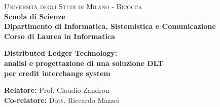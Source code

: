 \documentclass[a4paper,12pt]{report}
\begin{document}
    
    \begin{titlepage}
        
        \noindent
        \begin{minipage}[t]{0.19\textwidth}
        \end{minipage}
        \begin{minipage}[t]{0.81\textwidth}
        {
                {\textsc{Università degli Studi di Milano - Bicocca}} \\
                \textbf{Scuola di Scienze} \\
                \textbf{Dipartimento di Informatica, Sistemistica e Comunicazione} \\
                \textbf{Corso di Laurea in Informatica} \\
                \par
        }
        \end{minipage}
        
	\vspace{40mm}
        
	\begin{center}
            {\LARGE{
                    \textbf{Distributed Ledger Technology: \\
                    analisi e progettazione di una soluzione DLT \\
                    per credit interchange system }
                    \par
            }}
        \end{center}
        
        \vspace{50mm}

        \noindent
        {\large \textbf{Relatore:} Prof. Claudio Zandron } \\

        \noindent
        {\large \textbf{Co-relatore:} Dott. Riccardo Mazzei}
        
        \vspace{15mm}


\end{titlepage}
\end{document}
